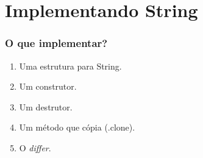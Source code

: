\documentclass{beamer}
\begin{document}
\section{Implementando String}
\begin{frame}
  \frametitle{O que implementar?}
  
  \begin{enumerate}
   \item<1-> Uma estrutura para String.
   \item<2-> Um construtor.
   \item<3-> Um destrutor.
   \item<4-> Um método que cópia (.clone).
   \item<5-> O \textit{differ}.
  \end{enumerate}

\end{frame}
\end{document}
